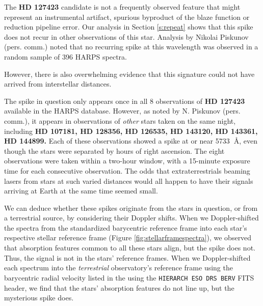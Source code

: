 \documentclass[linenumbers]{aastex701}
\providecommand{\DIFadd}[1]{{\bf #1}} %
\providecommand{\DIFaddbegin}{} %
\providecommand{\DIFaddend}{} %
\begin{document}
The  \DIFaddbegin \DIFadd{HD 127423 }\DIFaddend candidate is not a frequently observed feature that might represent an instrumental artifact, spurious byproduct of the blaze function or reduction pipeline error.  Our analysis in Section \ref{s:repeat} shows that this spike does not recur in other observations of this star.  Analysis by Nikolai Piskunov (pers. comm.) noted that no recurring spike at this wavelength was observed in a random sample of 396 HARPS spectra. 

However, there is also overwhelming evidence that this signature could not have arrived from interstellar distances.  

The spike in question only appears once in all 8 observations of  \DIFaddbegin \DIFadd{HD 127423 }\DIFaddend available in the HARPS database. However, as noted by N. Piskunov (pers. comm.), it appears in observations of \emph{other} stars taken on the same night, including  \DIFaddbegin \DIFadd{HD 107181, HD 128356, HD 126535, HD 143120, HD 143361, HD 144899.  }\DIFaddend Each of these observations showed a spike at or near 5733\DIFaddbegin \DIFadd{~}\DIFaddend \AA, even though the stars were separated by hours of right ascension. The eight observations were taken within a two-hour window, with a 15-minute exposure time for each consecutive observation. The odds that extraterrestrials beaming lasers from stars at such varied distances would all happen to have their signals arriving at Earth at the same time seemed small. 

We can deduce whether these spikes originate from the stars in question, or from a terrestrial source, by considering their Doppler shifts.  When we Doppler-shifted the spectra from the standardized barycentric reference frame into each star's respective stellar reference frame (Figure \ref{fig:stellarframespectra}), we observed that absorption features common to all these stars align, but the spike does not. Thus, the signal is not in the stars' reference frames.  When we Doppler-shifted each spectrum into the {\em terrestrial} observatory's reference frame using the barycentric radial velocity listed in the using the \texttt{HIERARCH ESO DRS BERV} FITS header, we find that the stars' absorption features do not line up, but the mysterious spike does.
\end{document}
